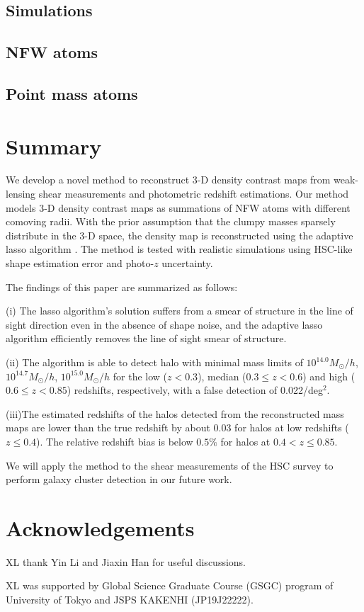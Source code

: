\documentclass[twocolumn]{aastex63}
\begin{document}
\subsection{Simulations}
\label{subsec_Sims}


\subsection{NFW atoms}
\label{subsec_test-nfw}


\subsection{Point mass atoms}
\label{subsec_test-pm}




\section{Summary}
\label{sec_Sum}

We develop a novel method to reconstruct $3$-D density contrast maps from
weak-lensing shear measurements and photometric redshift estimations.  Our
method models $3$-D density contrast maps as summations of NFW atoms with
different comoving radii.  With the prior assumption that the clumpy masses
sparsely distribute in the $3$-D space, the density map is reconstructed
using the adaptive lasso algorithm \citep{AdaLASSO-Zou2006}. The method is
tested with realistic simulations using HSC-like shape estimation error and
photo-$z$ uncertainty.

The findings of this paper are summarized as follows:

(i) The lasso algorithm's solution suffers from a smear of structure in the
line of sight direction even in the absence of shape noise, and the adaptive
lasso algorithm efficiently removes the line of sight smear of structure.

(ii) The algorithm is able to detect halo with minimal mass limits of
$10^{14.0} M_{\odot}/h$, $10^{14.7} M_{\odot}/h$, $10^{15.0} M_{\odot}/h$ for
the low ($z<0.3$), median ($0.3\leq z< 0.6$) and high ($0.6\leq z< 0.85$)
redshifts, respectively, with a false detection of 0.022/deg$^2$.

(iii)The estimated redshifts of the halos detected from the reconstructed mass
maps are lower than the true redshift by about $0.03$ for halos at low
redshifts ($z\leq 0.4$).  The relative redshift bias is below $0.5\%$ for halos
at $0.4<z\leq 0.85$.

We will apply the method to the shear measurements of the HSC survey
\citep{HSC1-catalog,FPFSHSC1-Li2020} to perform galaxy cluster detection in our
future work.

\section*{Acknowledgements}
XL thank Yin Li and Jiaxin Han for useful discussions.

XL was supported by Global Science Graduate Course (GSGC) program of
University of Tokyo and JSPS KAKENHI (JP19J22222).


\end{document}
